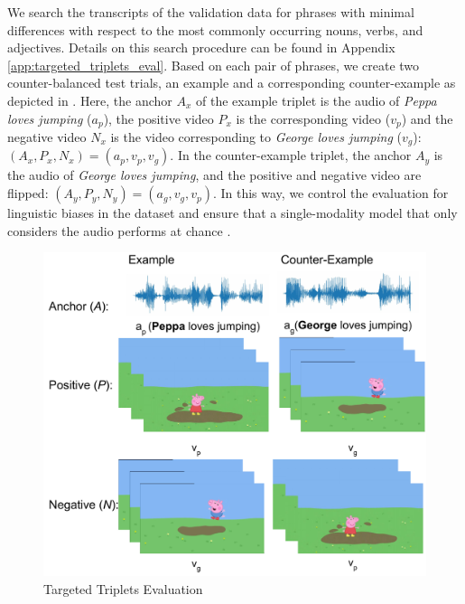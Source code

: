 We search the transcripts of the validation data for phrases with
minimal differences with respect to the most commonly occurring nouns,
verbs, and adjectives. Details on this search procedure can be found
in Appendix \ref{app:targeted_triplets_eval}.
Based on each pair of
phrases, we create two counter-balanced test trials, an example and a
corresponding counter-example as depicted in
. Here, the anchor $A_x$ of the example
triplet is the audio of \textit{Peppa loves jumping} ($a_p$), the
positive video $P_x$ is the corresponding video ($v_p$) and the
negative video $N_x$ is the video corresponding to \textit{George
  loves jumping} ($v_g$): $(A_x, P_x, N_x) = (a_p, v_p, v_g)$.  In the
counter-example triplet, the anchor $A_y$ is the audio of
\textit{George loves jumping}, and the positive and negative video are
flipped: $(A_y, P_y, N_y) = (a_g, v_g, v_p)$. In this way, we control
the evaluation for linguistic biases in the dataset and ensure that a
single-modality model that only considers the audio performs at chance
\citep[see also][]{nikolaus-fourtassi-2021-evaluating}.

\begin{figure}
  \centering
  \includegraphics[width=\columnwidth]{peppa_targeted_triplets.pdf}
  \caption{Targeted Triplets Evaluation}
  \label{fig:targeted_triplets}
\end{figure}

